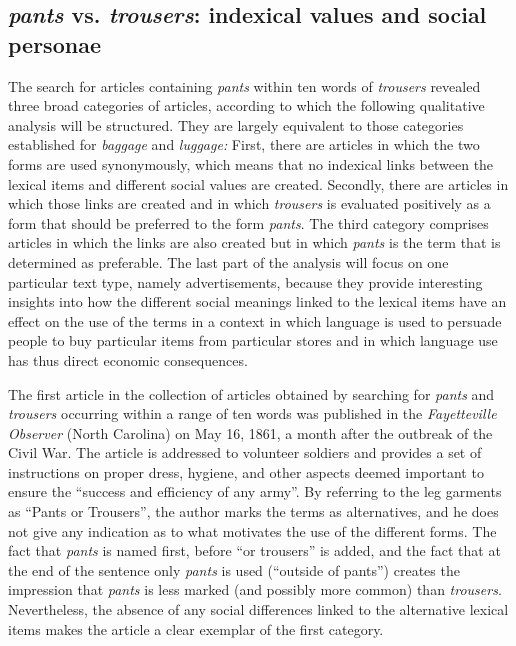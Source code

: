 \subsection{\emph{pants} vs. \emph{trousers}: indexical values and social personae}
\label{bkm:Ref9413051}\hypertarget{Toc63021244}{}
The search for articles containing \emph{pants} within ten words of \emph{trousers} revealed three broad categories of articles, according to which the following qualitative analysis will be structured. They are largely equivalent to those categories established for \emph{baggage} and \emph{luggage:} First, there are articles in which the two forms are used synonymously, which means that no indexical links between the lexical items and different social values are created. Secondly, there are articles in which those links are created and in which \emph{trousers} is evaluated positively as a form that should be preferred to the form \emph{pants}. The third category comprises articles in which the links are also created but in which \emph{pants} is the term that is determined as preferable. The last part of the analysis will focus on one particular text type, namely advertisements, because they provide interesting insights into how the different social meanings linked to the lexical items have an effect on the use of the terms in a context in which language is used to persuade people to buy particular items from particular stores and in which language use has thus direct economic consequences.


The first article in the collection of articles obtained by searching for \emph{pants} and \emph{trousers} occurring within a range of ten words was published in the \emph{Fayetteville Observer} (North Carolina) on May 16, 1861, a month after the outbreak of the Civil War. The article is addressed to volunteer soldiers and provides a set of instructions on proper dress, hygiene, and other aspects deemed important to ensure the “success and efficiency of any army”. By referring to the leg garments as “Pants or Trousers”, the author marks the terms as alternatives, and he does not give any indication as to what motivates the use of the different forms. The fact that \emph{pants} is named first, before “or trousers” is added, and the fact that at the end of the sentence only \emph{pants} is used (“outside of pants”) creates the impression that \emph{pants} is less marked (and possibly more common) than \emph{trousers}. Nevertheless, the absence of any social differences linked to the alternative lexical items makes the article a clear exemplar of the first category.


